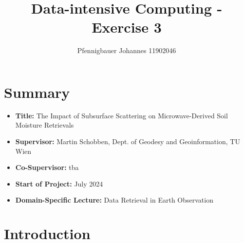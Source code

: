 \documentclass[12pt]{article}
\title{Data-intensive Computing - Exercise 3}
\author{Pfennigbauer Johannes 11902046}
\begin{document}
\maketitle

\section{Summary}
\begin{itemize}[label=]
    \item \textbf{Title:} The Impact of Subsurface Scattering on Microwave-Derived Soil Moisture Retrievals
    \item \textbf{Supervisor:} Martin Schobben, Dept. of Geodesy and Geoinformation, TU Wien
    \item \textbf{Co-Supervisor:} tba
    \item \textbf{Start of Project:} July 2024
    \item \textbf{Domain-Specific Lecture:} Data Retrieval in Earth Observation
\end{itemize}

\section{Introduction}
\end{document}
